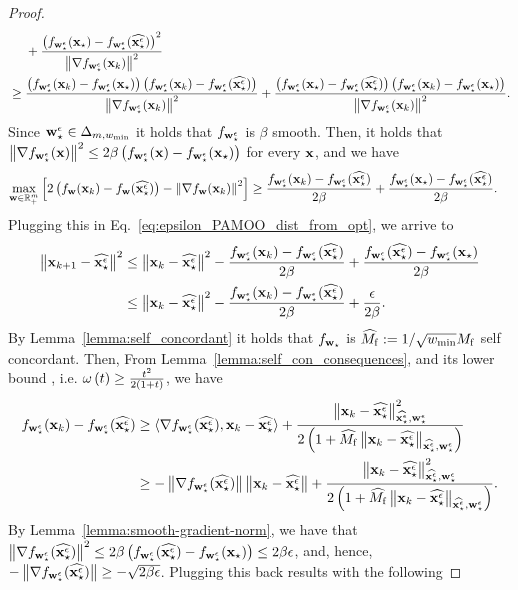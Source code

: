 \begin{proof}
\begin{align*}
    & ~~~~ + \frac{\brac{ f_{\wse}(\x_\star)- f_{\wse} (\widehat{\xse})}^2}{\enorm{\nabla f_{\wse}(\x_k)}^2}\\
    & \geq \frac{\brac{f_{\wse}(\x_k)- f_{\wse} (\x_\star)}\brac{f_{\wse}(\x_k)- f_{\wse} (\widehat{\xse})}}{\enorm{\nabla f_{\wse}(\x_k)}^2} + \frac{\brac{ f_{\wse}(\x_\star)- f_{\wse} (\widehat{\xse})}\brac{f_{\wse}(\x_k)- f_{\wse} (\x_\star)}}{\enorm{\nabla f_{\wse}(\x_k)}^2}.
\end{align*}
Since $\wse\in \Delta_{m,\wmin}$ it holds that $f_{\wse}$ is $\beta$ smooth. Then, it holds that $\enorm{\nabla f_{\wse}(\x)}^2 \leq 2\beta \brac{f_{\wse}(\x)- f_{\wse} (\x_\star)}$ for every $\x$, and we have
\begin{align*}
     \max_{\w\in \reals_+^m} \left[ 2\brac{f_{\w}(\x_k)- f_{\w} (\widehat{\xse})} - \enorm{\nabla f_{\w}(\x_k)}^2 \right] & \geq \frac{f_{\wse}(\x_k)- f_{\wse} (\widehat{\xse})}{2 \beta} + \frac{ f_{\wse}(\x_\star)- f_{\wse} (\widehat{\xse})}{2\beta}.
\end{align*}
Plugging this in Eq.~\eqref{eq:epsilon_PAMOO_dist_from_opt}, we arrive to 
\begin{align*}
    \enorm{\x_{k+1}-\widehat{\xse}}^2 &\leq \enorm{\x_k-\widehat{\xse}}^2 -  \frac{ f_{\wse}(\x_k)- f_{\wse} (\widehat{\xse})}{2 \beta} + \frac{ f_{\wse} (\widehat{\xse}) - f_{\wse}(\x_\star)}{2\beta}\\
    &\leq \enorm{\x_k-\widehat{\xse}}^2 -  \frac{ f_{\wse}(\x_k)- f_{\wse} (\widehat{\xse})}{2 \beta} + \frac{ \epsilon}{2\beta}.
\end{align*}
By Lemma~\ref{lemma:self_concordant} it holds that $f_{\w_\star}$ is $\widehat{M_{\mathrm{f}}}:=1/\sqrt{\wmin} M_{\mathrm{f}}$ self concordant. Then, From Lemma~\ref{lemma:self_con_consequences}, and its lower bound , i.e. $\omega\brac{t} \geq \frac{t^2}{2\brac{1+t}}$, we have
\begin{align*}
       f_{\wse}(\x_k) -f_{\wse}(\widehat{\xse}) & \geq \inner{\nabla f_{\wse}(\widehat{\xse})}{\x_k - \widehat{\xse}} +  \frac{\enorm{\x_k - \widehat{\xse}}_{ \widehat{\xse},\wse}^2}{2\brac{1+\widehat{M_{\mathrm{f}}}\enorm{\x_k - \widehat{\xse}}_{\widehat{\xse},\wse}}} \\
       & \geq -\enorm{\nabla f_{\wse}(\widehat{\xse})} \enorm{\x_k - \widehat{\xse}} +  \frac{\enorm{\x_k - \widehat{\xse}}_{ \widehat{\xse},\wse}^2}{2\brac{1+\widehat{M_{\mathrm{f}}}\enorm{\x_k - \widehat{\xse}}_{\widehat{\xse},\wse}}} .
\end{align*}
By Lemma~\ref{lemma:smooth-gradient-norm}, we have that $\enorm{\nabla f_{\wse}(\widehat{\xse})}^2 \leq 2\beta \brac{f_{\wse}(\widehat{\xse})- f_{\wse} (\x_\star)}\leq 2\beta \epsilon$, and, hence, $-\enorm{\nabla f_{\wse}(\widehat{\xse})}\geq -\sqrt{2\beta\epsilon}$. Plugging this back results with the following

\end{proof}
